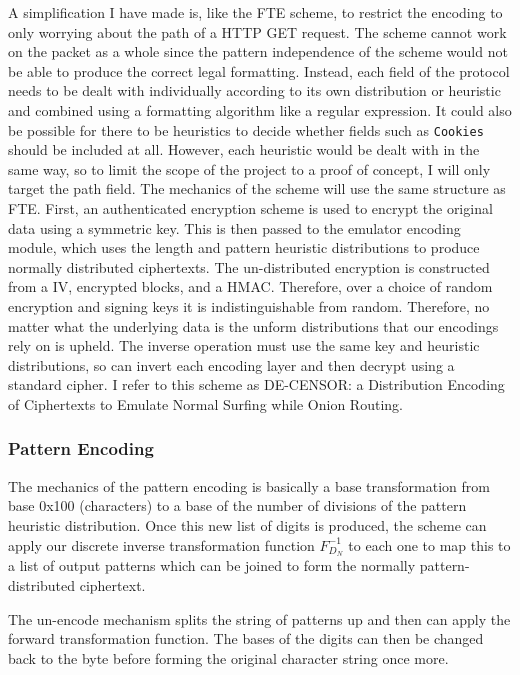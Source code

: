 \documentclass[ %
                    author={Samuel Russell},
                supervisor={Prof. Bogdan Warinschi},
                    degree={MEng},
                     title={Innocuous Ciphertexts},
                  subtitle={The DE-CENSOR Scheme},
                      type={research},
                      year={2018} ]{dissertation}
\begin{document}
A simplification I have made is, like the FTE scheme, to restrict the encoding to only worrying about the path of a HTTP GET request.
The scheme cannot work on the packet as a whole since the pattern independence of the scheme would not be able to produce the correct legal formatting.
Instead, each field of the protocol needs to be dealt with individually according to its own distribution or heuristic and combined using a formatting algorithm like a regular expression.
It could also be possible for there to be heuristics to decide whether fields such as \texttt{Cookies} should be included at all.
However, each heuristic would be dealt with in the same way, so to limit the scope of the project to a proof of concept, I will only target the path field.
The mechanics of the scheme will use the same structure as FTE. First, an authenticated encryption scheme is used to encrypt the original data using a symmetric key.
This is then passed to the emulator encoding module, which uses the length and pattern heuristic distributions to produce normally distributed ciphertexts.
The un-distributed encryption is constructed from a IV, encrypted blocks, and a HMAC. Therefore, over a choice of random encryption and signing keys it is indistinguishable from random.
Therefore, no matter what the underlying data is the unform distributions that our encodings rely on is upheld. 
The inverse operation must use the same key and heuristic distributions, so can invert each encoding layer and then decrypt using a standard cipher.
I refer to this scheme as DE-CENSOR: a Distribution Encoding of Ciphertexts to Emulate Normal Surfing while Onion Routing.

\subsubsection{Pattern Encoding}

The mechanics of the pattern encoding is basically a base transformation from base 0x100 (characters) to a base of the number of divisions of the pattern heuristic distribution.
Once this new list of digits is produced, the scheme can apply our discrete inverse transformation function $F^{-1}_{D_N}$ to each one to map this to a list of output patterns which can be joined to form the normally pattern-distributed ciphertext.

The un-encode mechanism splits the string of patterns up and then can apply the forward transformation function. The bases of the digits can then be changed back to the byte before forming the original character string once more.
\end{document}
